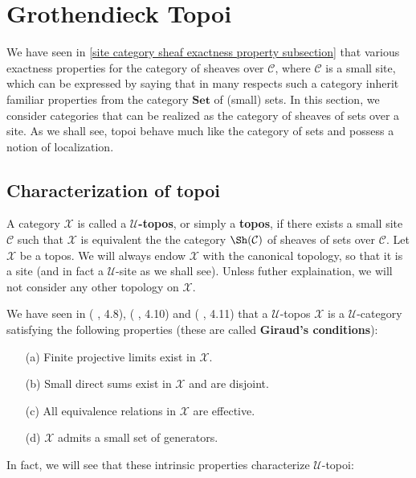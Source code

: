 \section{Grothendieck Topoi}
We have seen in \autoref{site category sheaf exactness property subsection} that various exactness properties for the category of sheaves over $\mathcal{C}$, where $\mathcal{C}$ is a small site, which can be expressed by saying that in many respects such a category inherit familiar properties from the category $\mathbf{Set}$ of (small) sets. In this section, we consider categories that can be realized as the category of sheaves of sets over a site. As we shall see, topoi behave much like the category of sets and possess a notion of localization.
\subsection{Characterization of topoi}
A category $\mathcal{X}$ is called a \textbf{$\mathscr{U}$-topos}, or simply a \textbf{topos}, if there exists a small site $\mathcal{C}$ such that $\mathcal{X}$ is equivalent the the category $\Sh(\mathcal{C})$ of sheaves of sets over $\mathcal{C}$. Let $\mathcal{X}$ be a topos. We will always endow $\mathcal{X}$ with the canonical topology, so that it is a site (and in fact a $\mathscr{U}$-site as we shall see). Unless futher explaination, we will not consider any other topology on $\mathcal{X}$.\par
We have seen in (\cite{SGA4-1} , 4.8), (\cite{SGA4-1} , 4.10) and (\cite{SGA4-1} , 4.11) that a $\mathscr{U}$-topos $\mathcal{X}$ is a $\mathscr{U}$-category satisfying the following properties (these are called \textbf{Giraud's conditions}):
\begin{enumerate}
\item[(a)] Finite projective limits exist in $\mathcal{X}$.
\item[(b)] Small direct sums exist in $\mathcal{X}$ and are disjoint.
\item[(c)] All equivalence relations in $\mathcal{X}$ are effective.
\item[(d)] $\mathcal{X}$ admits a small set of generators.
\end{enumerate}
In fact, we will see that these intrinsic properties characterize $\mathscr{U}$-topoi:
